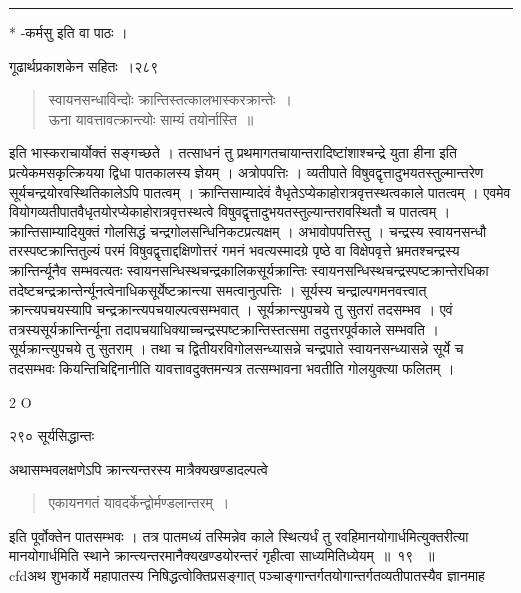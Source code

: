 \documentclass[11pt, openany]{book}
\begin{document}
\noindent\rule{\linewidth}{.5pt}

\begin{center}
 * -कर्मसु इति वा पाठः ।
\end{center}

\newpage


\hspace{3cm} गूढार्थप्रकाशकेन सहितः~।\hfill २८९
\vspace{2mm}


\begin{quote}
{\qt स्वायनसन्धाविन्दोः क्रान्तिस्तत्कालभास्करक्रान्तेः~।\\
 ऊना यावत्तावत्क्रान्त्योः साम्यं तयोर्नास्ति~॥}
\end{quote}

इति भास्कराचार्योक्तं सङ्गच्छते । तत्साधनं तु प्रथमागतचायान्तरादिष्टांशाश्चन्द्रे युता हीना इति प्रत्येकमसकृत्क्रियया द्विधा पातकालस्य ज्ञेयम् । अत्रोपपत्तिः । व्यतीपाते विषुवद्वृत्तादुभयतस्तुल्मान्तरेण सूर्यचन्द्रयोरवस्थितिकालेऽपि पातत्वम् । क्रान्तिसाम्यादेवं वैधृतेऽप्येकाहोरात्रवृत्तस्थत्वकाले पातत्वम् । एवमेव वियोगव्यतीपातवैधृतयोरप्येकाहोरात्रवृत्तस्थत्वे विषुवद्वृत्तादुभयतस्तुल्यान्तरावस्थितौ च पातत्वम् । क्रान्तिसाम्यादियुक्तं गोलसिद्धं चन्द्रगोलसन्धिनिकटप्रत्यक्षम् । अभावोपपत्तिस्तु । चन्द्रस्य स्वायनसन्धौ तरस्पष्टक्रान्तितुल्यं परमं विषुवद्वृत्ताद्दक्षिणोत्तरं गमनं भवत्यस्मादग्रे पृष्ठे वा विक्षेपवृत्ते भ्रमतश्चन्द्रस्य क्रान्तिर्न्यूनैव सम्भवत्यतः स्वायनसन्धिस्थचन्द्रकालिकसूर्यक्रान्तिः स्वायनसन्धिस्थचन्द्रस्पष्टक्रान्तेरधिका तदेष्टचन्द्रक्रान्तेर्न्यूनत्वेनाधिकसूर्येष्टक्रान्त्या समत्वानुत्पत्तिः । सूर्यस्य चन्द्राल्पगमनवत्त्वात् क्रान्त्यपचयस्यापि चन्द्रक्रान्त्यपचयाल्पत्वसम्भवात् । सूर्यक्रान्त्युपचये तु सुतरां तदसम्भव । एवं तत्रस्यसूर्यक्रान्तिर्न्यूना तदापचयाधिक्याच्चन्द्रस्पष्टक्रान्तिस्तत्समा तदुत्तरपूर्वकाले सम्भवति । सूर्यक्रान्त्युपचये तु सुतराम् । तथा च द्वितीयरविगोलसन्ध्यासन्ने चन्द्रपाते स्वायनसन्ध्यासन्ने सूर्ये च तदसम्भवः कियन्तिचिद्दिनानीति यावत्तावदुक्तमन्यत्र तत्सम्भावना भवतीति गोलयुक्त्या फलितम् ।


{\tiny{2 O}}

\newpage



\noindent २९० \hspace{4cm} सूर्यसिद्धान्तः
\vspace{1cm}


अथासम्भवलक्षणेऽपि क्रान्त्यन्तरस्य मात्रैक्यखण्डादल्पत्वे \textendash

\begin{quote}
{\qt एकायनगतं यावदर्केन्द्वोर्मण्डलान्तरम्~।}
\end{quote}
इति पूर्वोक्तेन पातसम्भवः । तत्र पातमध्यं तस्मिन्नेव काले स्थित्यर्धं तु रवहिमानयोगार्धमित्युक्तरीत्या मानयोगार्धमिति स्थाने क्रान्त्यन्तरमानैक्यखण्डयोरन्तरं गृहीत्वा साध्यमितिध्येयम्~॥~१९ ~॥\\
\noindent  cfdअथ शुभकार्ये महापातस्य निषिद्धत्वोक्तिप्रसङ्गात् पञ्चाङ्गान्तर्गतयोगान्तर्गतव्यतीपातस्यैव ज्ञानमाह \textendash
\end{document}
